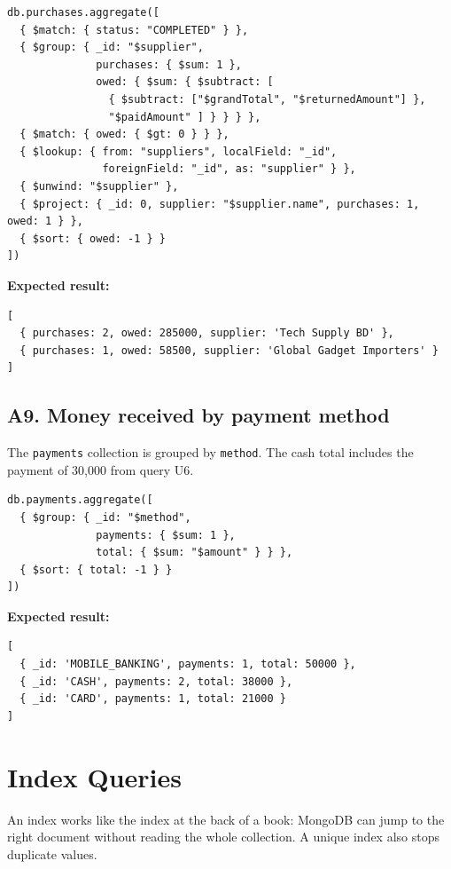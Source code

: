 \documentclass[11pt,a4paper]{article}
\newcommand{\code}[1]{\texttt{#1}}
\begin{document}
\begin{minipage}{\linewidth}
\begin{lstlisting}[style=query]
db.purchases.aggregate([
  { $match: { status: "COMPLETED" } },
  { $group: { _id: "$supplier",
              purchases: { $sum: 1 },
              owed: { $sum: { $subtract: [
                { $subtract: ["$grandTotal", "$returnedAmount"] },
                "$paidAmount" ] } } } },
  { $match: { owed: { $gt: 0 } } },
  { $lookup: { from: "suppliers", localField: "_id",
               foreignField: "_id", as: "supplier" } },
  { $unwind: "$supplier" },
  { $project: { _id: 0, supplier: "$supplier.name", purchases: 1, owed: 1 } },
  { $sort: { owed: -1 } }
])
\end{lstlisting}
\end{minipage}

\noindent\textbf{Expected result:}
\begin{lstlisting}[style=result]
[
  { purchases: 2, owed: 285000, supplier: 'Tech Supply BD' },
  { purchases: 1, owed: 58500, supplier: 'Global Gadget Importers' }
]
\end{lstlisting}

\subsection*{A9. Money received by payment method}
The \code{payments} collection is grouped by \code{method}. The cash total includes the payment of 30,000 from query U6.

\begin{minipage}{\linewidth}
\begin{lstlisting}[style=query]
db.payments.aggregate([
  { $group: { _id: "$method",
              payments: { $sum: 1 },
              total: { $sum: "$amount" } } },
  { $sort: { total: -1 } }
])
\end{lstlisting}
\end{minipage}

\noindent\textbf{Expected result:}
\begin{lstlisting}[style=result]
[
  { _id: 'MOBILE_BANKING', payments: 1, total: 50000 },
  { _id: 'CASH', payments: 2, total: 38000 },
  { _id: 'CARD', payments: 1, total: 21000 }
]
\end{lstlisting}

\section{Index Queries}
An index works like the index at the back of a book: MongoDB can jump to the right document without reading the whole collection. A unique index also stops duplicate values.
\end{document}
